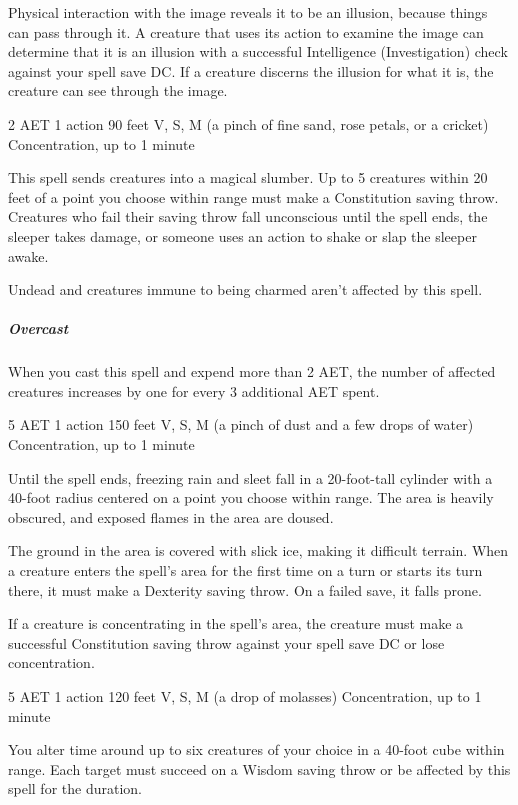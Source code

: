 Physical interaction with the image reveals it to be an illusion, because things can pass through it. A creature that uses its action to examine the image can determine that it is an illusion with a successful Intelligence (Investigation) check against your spell save DC. If a creature discerns the illusion for what it is, the creature can see through the image.


{2 AET}
{1 action}
{90 feet}
{V, S, M (a pinch of fine sand, rose petals, or a cricket)}
{Concentration, up to 1 minute}

This spell sends creatures into a magical slumber. Up to 5 creatures within 20 feet of a point you choose within range must make a Constitution saving throw. Creatures who fail their saving throw fall unconscious until the spell ends, the sleeper takes damage, or someone uses an action to shake or slap the sleeper awake.

Undead and creatures immune to being charmed aren't affected by this spell.

\subparagraph*{Overcast} When you cast this spell and expend more than 2 AET, the number of affected creatures increases by one for every 3 additional AET spent.


{5 AET}
{1 action}
{150 feet}
{V, S, M (a pinch of dust and a few drops of water)}
{Concentration, up to 1 minute}

Until the spell ends, freezing rain and sleet fall in a 20-foot-tall cylinder with a 40-foot radius centered on a point you choose within range. The area is heavily obscured, and exposed flames in the area are doused.

The ground in the area is covered with slick ice, making it difficult terrain. When a creature enters the spell's area for the first time on a turn or starts its turn there, it must make a Dexterity saving throw. On a failed save, it falls prone.

If a creature is concentrating in the spell's area, the creature must make a successful Constitution saving throw against your spell save DC or lose concentration.


{5 AET}
{1 action}
{120 feet}
{V, S, M (a drop of molasses)}
{Concentration, up to 1 minute}

You alter time around up to six creatures of your choice in a 40-foot cube within range. Each target must succeed on a Wisdom saving throw or be affected by this spell for the duration.


